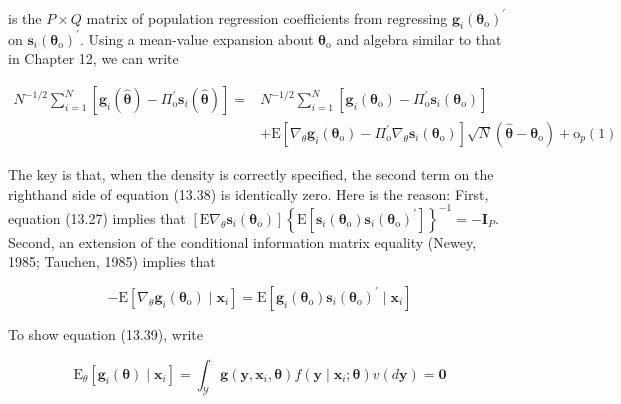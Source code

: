 \documentclass[10pt]{article}
\begin{document}
is the $P \times Q$ matrix of population regression coefficients from regressing $\mathbf{g}_{i}\left(\boldsymbol{\theta}_{\mathrm{o}}\right)^{\prime}$ on $\mathbf{s}_{i}\left(\boldsymbol{\theta}_{\mathrm{o}}\right)^{\prime}$. Using a mean-value expansion about $\boldsymbol{\theta}_{\mathrm{o}}$ and algebra similar to that in Chapter 12, we can write


\begin{align*}
N^{-1 / 2} \sum_{i=1}^{N}\left[\mathbf{g}_{i}(\hat{\boldsymbol{\theta}})-\Pi_{\mathrm{o}}^{\prime} \mathbf{s}_{i}(\hat{\boldsymbol{\theta}})\right]= & N^{-1 / 2} \sum_{i=1}^{N}\left[\mathbf{g}_{i}\left(\boldsymbol{\theta}_{\mathrm{o}}\right)-\Pi_{\mathrm{o}}^{\prime} \mathbf{s}_{i}\left(\boldsymbol{\theta}_{\mathrm{o}}\right)\right] \\
& +\mathrm{E}\left[\nabla_{\theta} \mathbf{g}_{i}\left(\boldsymbol{\theta}_{\mathrm{o}}\right)-\Pi_{\mathrm{o}}^{\prime} \nabla_{\theta} \mathbf{s}_{i}\left(\boldsymbol{\theta}_{\mathrm{o}}\right)\right] \sqrt{N}\left(\hat{\boldsymbol{\theta}}-\boldsymbol{\theta}_{\mathrm{o}}\right)+\mathrm{o}_{p}(1) \tag{13.38}
\end{align*}


The key is that, when the density is correctly specified, the second term on the righthand side of equation (13.38) is identically zero. Here is the reason: First, equation (13.27) implies that $\left[\mathrm{E} \nabla_{\theta} \mathbf{s}_{i}\left(\boldsymbol{\theta}_{\mathrm{o}}\right)\right]\left\{\mathrm{E}\left[\mathbf{s}_{i}\left(\boldsymbol{\theta}_{\mathrm{o}}\right) \mathbf{s}_{i}\left(\boldsymbol{\theta}_{\mathrm{o}}\right)^{\prime}\right]\right\}^{-1}=-\mathbf{I}_{P}$. Second, an extension of the conditional information matrix equality (Newey, 1985; Tauchen, 1985) implies that


\begin{equation*}
-\mathrm{E}\left[\nabla_{\theta} \mathbf{g}_{i}\left(\boldsymbol{\theta}_{\mathrm{o}}\right) \mid \mathbf{x}_{i}\right]=\mathrm{E}\left[\mathbf{g}_{i}\left(\boldsymbol{\theta}_{\mathrm{o}}\right) \mathbf{s}_{i}\left(\boldsymbol{\theta}_{\mathrm{o}}\right)^{\prime} \mid \mathbf{x}_{i}\right] \tag{13.39}
\end{equation*}


To show equation (13.39), write


\begin{equation*}
\mathrm{E}_{\theta}\left[\mathbf{g}_{i}(\boldsymbol{\theta}) \mid \mathbf{x}_{i}\right]=\int_{\mathscr{Y}} \mathbf{g}\left(\mathbf{y}, \mathbf{x}_{i}, \boldsymbol{\theta}\right) f\left(\mathbf{y} \mid \mathbf{x}_{i} ; \boldsymbol{\theta}\right) v(d \mathbf{y})=\mathbf{0} \tag{13.40}
\end{equation*}
\end{document}
